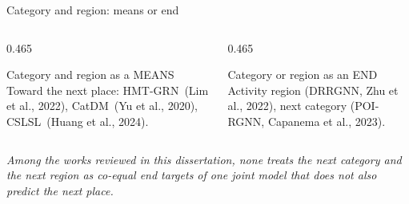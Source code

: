 \documentclass{beamer}
\begin{document}
\begin{frame}{Category and region: means or end}
    \begin{columns}[t,onlytextwidth]
        \begin{column}{0.465\textwidth}
            \begin{block}{Category and region as a MEANS}
                \small
                Toward the next place: HMT-GRN~{\scriptsize(Lim et al., 2022)}, CatDM~{\scriptsize(Yu et al., 2020)}, CSLSL~{\scriptsize(Huang et al., 2024)}.
            \end{block}
        \end{column}
        \hfill
        \begin{column}{0.465\textwidth}
            \begin{exampleblock}{Category or region as an END}
                \small
                Activity region (DRRGNN, {\scriptsize Zhu et al., 2022}), next category
                (POI-RGNN, {\scriptsize Capanema et al., 2023}).
            \end{exampleblock}
        \end{column}
    \end{columns}

    \bigskip
    {\small\itshape
    Among the works reviewed in this dissertation, none treats the next category and the
    next region as co-equal end targets of one joint model that does not also predict the
    next place.\par}


\end{frame}
\end{document}

